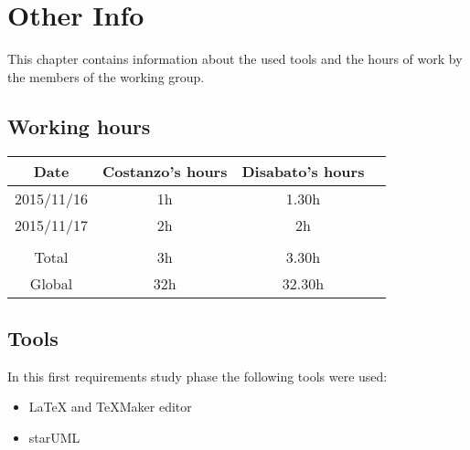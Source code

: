 \documentclass[../dd]{subfiles}
\begin{document}
\chapter{Other Info}
\label{other_info}

\setmyfancystyle

This chapter contains information about the used tools and the hours of work by the members of the working group.

\section{Working hours}
\begin{table}[h!]
\begin{tabular}{cccc}
\hline
Date & Costanzo's hours & Disabato's hours  &    \\ \hline
2015/11/16 & 1h & 1.30h &    \\ \hline
2015/11/17 & 2h & 2h &    \\ \hline \\
Total & 3h & 3.30h & \\ \hline
Global & 32h & 32.30h & \\ \hline

\end{tabular}
\end{table}

\section{Tools}
In this first requirements study phase the following tools were used:
\begin{itemize}
	\item \LaTeX{} and TeXMaker editor
	\item starUML
\end{itemize}
\end{document}
